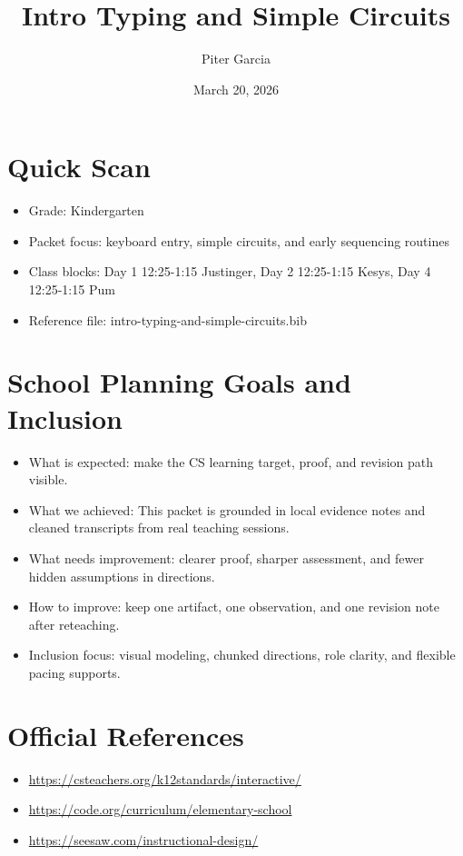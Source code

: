 \documentclass[11pt]{article}
\title{Intro Typing and Simple Circuits}
\author{Piter Garcia}
\date{March 20, 2026}
\begin{document}
\maketitle
\section*{Quick Scan}
\begin{itemize}[leftmargin=*]
\item Grade: Kindergarten
\item Packet focus: keyboard entry, simple circuits, and early sequencing routines
\item Class blocks: Day 1 12:25-1:15 Justinger, Day 2 12:25-1:15 Kesys, Day 4 12:25-1:15 Pum
\item Reference file: intro-typing-and-simple-circuits.bib
\end{itemize}
\section*{School Planning Goals and Inclusion}
\begin{itemize}[leftmargin=*]
\item What is expected: make the CS learning target, proof, and revision path visible.
\item What we achieved: This packet is grounded in local evidence notes and cleaned transcripts from real teaching sessions.
\item What needs improvement: clearer proof, sharper assessment, and fewer hidden assumptions in directions.
\item How to improve: keep one artifact, one observation, and one revision note after reteaching.
\item Inclusion focus: visual modeling, chunked directions, role clarity, and flexible pacing supports.
\end{itemize}
\section*{Official References}
\begin{itemize}[leftmargin=*]
\item \url{https://csteachers.org/k12standards/interactive/}
\item \url{https://code.org/curriculum/elementary-school}
\item \url{https://seesaw.com/instructional-design/}
\end{itemize}
\end{document}
